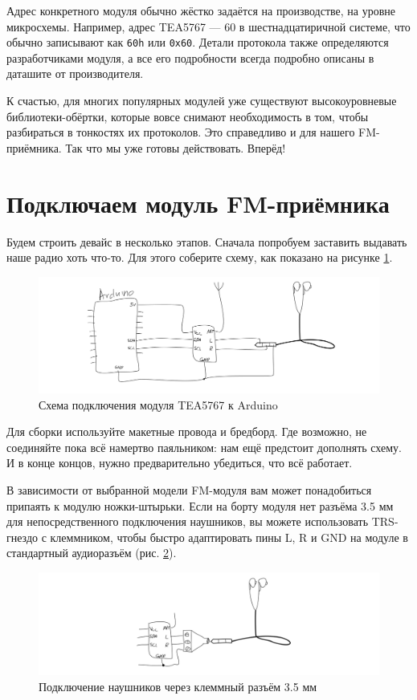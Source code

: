 Адрес конкретного модуля обычно жёстко задаётся на производстве, на уровне микросхемы. Например, адрес TEA5767 — 60 в шестнадцатиричной системе, что обычно записывают как \texttt{60h} или \texttt{0x60}.  Детали протокола также определяются разработчиками модуля, а все его подробности всегда подробно описаны в даташите от производителя.

К счастью, для многих популярных модулей уже существуют высокоуровневые библиотеки-обёртки, которые вовсе снимают необходимость в том, чтобы разбираться в тонкостях их протоколов. Это справедливо и для нашего FM-приёмника. Так что мы уже готовы действовать. Вперёд!

\section{Подключаем модуль FM-приёмника}

Будем строить девайс в несколько этапов. Сначала попробуем заставить выдавать наше радио хоть что-то. Для этого соберите схему, как показано на рисунке \ref{fig:tea5767-wiring}.

\begin{figure}
  \centering
  \includegraphics{sketches/tea5767-wiring}
  \caption{Схема подключения модуля TEA5767 к Arduino}
  \label{fig:tea5767-wiring}
\end{figure}

Для сборки используйте макетные провода и бредборд. Где возможно, не соединяйте пока всё намертво паяльником: нам ещё предстоит дополнять схему. И в конце концов, нужно предварительно убедиться, что всё работает.

В зависимости от выбранной модели FM-модуля вам может понадобиться припаять к модулю ножки-штырьки. Если на борту модуля нет разъёма 3.5 мм для непосредственного подключения наушников, вы можете использовать TRS-гнездо с клеммником, чтобы быстро адаптировать пины L, R и GND на модуле в стандартный аудиоразъём (рис. \ref{fig:trs-35-mm}).

\begin{figure}
  \centering
  \includegraphics{sketches/trs-35-mm}
  \caption{Подключение наушников через клеммный разъём 3.5 мм}
  \label{fig:trs-35-mm}
\end{figure}

